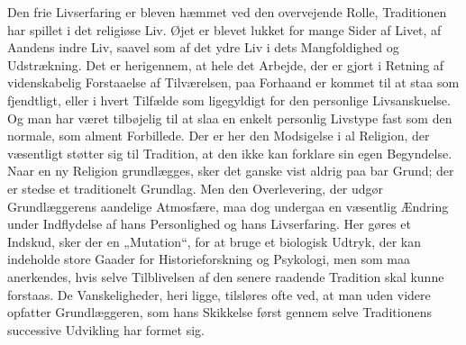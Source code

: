 \documentclass[12pt,a4paper]{article}
\begin{document}
Den frie Livserfaring er bleven hæmmet ved den overvejende Rolle, Traditionen
har spillet i det religiøse Liv. Øjet er blevet lukket for mange Sider af Livet,
af Aandens indre Liv, saavel som af det ydre Liv i dets Mangfoldighed og
Udstrækning. Det er herigennem, at hele det Arbejde, der er gjort i Retning af
videnskabelig Forstaaelse af Tilværelsen, paa Forhaand er kommet til at staa som
fjendtligt, eller i hvert Tilfælde som ligegyldigt for den personlige
Livsanskuelse. Og man har været tilbøjelig til at slaa en enkelt personlig
Livstype fast som den normale, som alment Forbillede. Der er her den Modsigelse i
al Religion, der væsentligt støtter sig til Tradition, at den ikke kan forklare
sin egen Begyndelse. Naar en ny Religion grundlægges, sker det ganske vist
aldrig paa bar Grund; der er stedse et traditionelt Grundlag. Men den
Overlevering, der udgør Grundlæggerens aandelige Atmosfære, maa dog undergaa en
væsentlig Ændring under Indflydelse af hans Personlighed og hans Livserfaring.
Her gøres et Indskud, sker der en „Mutation“, for at bruge et biologisk Udtryk,
der kan indeholde store Gaader for Historieforskning og Psykologi, men som maa
anerkendes, hvis selve Tilblivelsen af den senere raadende Tradition skal kunne
forstaas. De Vanskeligheder, heri ligge, tilsløres ofte ved, at man uden videre
opfatter Grundlæggeren, som hans Skikkelse først gennem selve Traditionens
successive Udvikling har formet sig.
\end{document}
